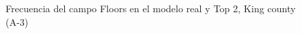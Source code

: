 \begin{figure}[H]
    \centering
    
    \caption{Frecuencia del campo Floors en el modelo real y Top 2, King county (A-3)}
    \label{frecuency-top2-floors}
\end{figure}